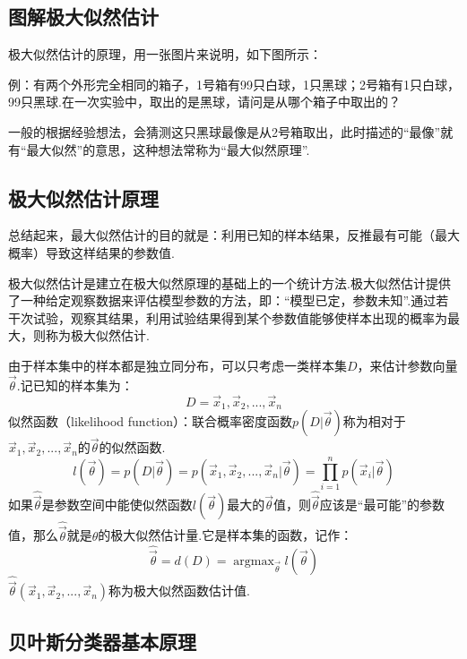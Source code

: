 \subsection{图解极大似然估计}\label{ux56feux89e3ux6781ux5927ux4f3cux7136ux4f30ux8ba1}

极大似然估计的原理，用一张图片来说明，如下图所示：

 

​
例：有两个外形完全相同的箱子，1号箱有99只白球，1只黑球；2号箱有1只白球，99只黑球.在一次实验中，取出的是黑球，请问是从哪个箱子中取出的？

​
一般的根据经验想法，会猜测这只黑球最像是从2号箱取出，此时描述的``最像''就有``最大似然''的意思，这种想法常称为``最大似然原理''.

\subsection{极大似然估计原理}\label{ux6781ux5927ux4f3cux7136ux4f30ux8ba1ux539fux7406}

​
总结起来，最大似然估计的目的就是：利用已知的样本结果，反推最有可能（最大概率）导致这样结果的参数值.

​
极大似然估计是建立在极大似然原理的基础上的一个统计方法.极大似然估计提供了一种给定观察数据来评估模型参数的方法，即：``模型已定，参数未知''.通过若干次试验，观察其结果，利用试验结果得到某个参数值能够使样本出现的概率为最大，则称为极大似然估计.

​
由于样本集中的样本都是独立同分布，可以只考虑一类样本集$D$，来估计参数向量$\vec\theta$.记已知的样本集为：
\[
D=\vec x_{1},\vec x_{2},...,\vec x_{n}
\] 似然函数（likelihood
function）：联合概率密度函数$p(D|\vec\theta )$称为相对于$\vec x_{1},\vec x_{2},...,\vec x_{n}$的$\vec\theta$的似然函数.
\[
l(\vec\theta )=p(D|\vec\theta ) =p(\vec x_{1},\vec x_{2},...,\vec x_{n}|\vec\theta )=\prod_{i=1}^{n}p(\vec x_{i}|\vec \theta )
\]
如果$\hat{\vec\theta}$是参数空间中能使似然函数$l(\vec\theta)$最大的$\vec\theta$值，则$\hat{\vec\theta}$应该是``最可能''的参数值，那么$\hat{\vec\theta}​$就是$\theta$的极大似然估计量.它是样本集的函数，记作：
\[
\hat{\vec\theta}=d(D)= \mathop {\arg \max}_{\vec\theta} l(\vec\theta )
\]
$\hat{\vec\theta}(\vec x_{1},\vec x_{2},...,\vec x_{n})$称为极大似然函数估计值.

\subsection{贝叶斯分类器基本原理}\label{ux8d1dux53f6ux65afux5206ux7c7bux5668ux57faux672cux539fux7406}

